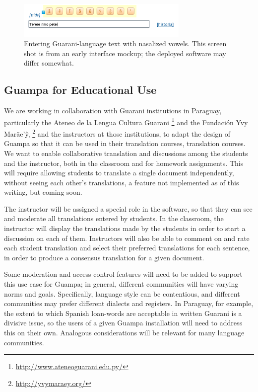 \documentclass[10pt, a4paper]{article}
\begin{document}
\begin{figure}
\includegraphics[width=8.25cm]{guampa-tildes}
\caption{Entering Guarani-language text with nasalized vowels. This screen shot
is from an early interface mockup; the deployed software may differ
somewhat.}
\label{fig:diacritics}
\end{figure}

\subsection{Guampa for Educational Use}
We are working in collaboration with Guarani institutions in Paraguay,
particularly the Ateneo de la Lengua Cultura Guarani
\footnote{\url{http://www.ateneoguarani.edu.py/}}
and the Fundación Yvy Mar\~{a}e'\~{y},
\footnote{\url{http://yvymaraey.org/}}
and the instructors at those institutions, to adapt the design of Guampa
so that it can be used in their translation courses, translation courses.
We want to enable collaborative translation and discussions among the students
and the instructor, both in the classroom and for homework assignments. This
will require allowing students to translate a single document independently,
without seeing each other's translations, a feature not implemented as of this
writing, but coming soon.

The instructor will be assigned a special role in the software, so that they
can see and moderate all translations entered by students. In the classroom,
the instructor will display the translations made by the students in order to
start a discussion on each of them.  Instructors will also be able to comment
on and rate each student translation and select their preferred translations
for each sentence, in order to produce a consensus translation for a given
document.

Some moderation and access control features will need to be added to support
this use case for Guampa; in general, different communities will have varying
norms and goals. Specifically, language style can be contentious, and
different communities may prefer different dialects and registers. In Paraguay,
for example, the extent to which Spanish loan-words are acceptable in written
Guarani is a divisive issue, so the users of a given Guampa installation will
need to address this on their own. Analogous considerations will be relevant
for many language communities.
\end{document}
